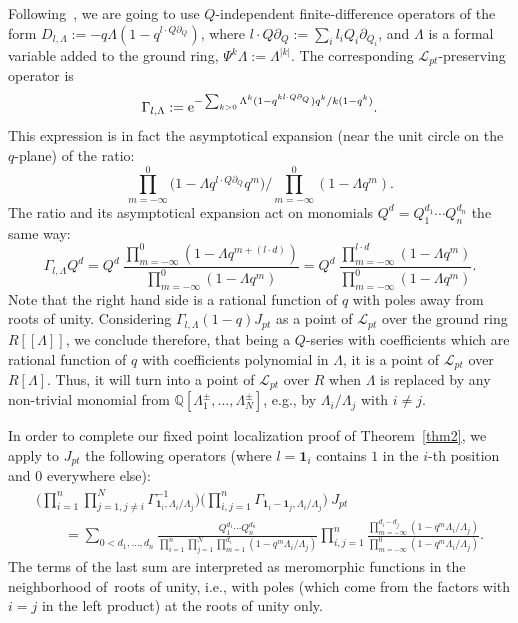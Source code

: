 \documentclass[pdftex]{sigma}
\numberwithin{equation}{section}
\def\L{\mathcal L}
\def\1{\mathbf 1}
\def\QQ{\mathbb Q}
\def\p{\partial}
\begin{document}
Following~\cite{Givental:perm4}, we are going to use $Q$-independent finite-difference operators of the form $D_{l,\Lambda}:=-q \Lambda (1-q^{l\cdot Q\p_Q})$, where $l\cdot Q\p_Q:=\sum_i l_iQ_i\p_{Q_i}$, and $\Lambda$ is a formal variable added to the ground ring, $\Psi^k\Lambda:=\Lambda^{|k|}$. The corresponding $\L_{pt}$-preserving operator is
\[
\Gamma_{l,\Lambda}:= {\rm e}^{ -\sum_{k>0}\Lambda^k
(1-q^{kl\cdot Q\p_Q})q^k/k(1-q^k)}.
\]
This expression is in fact the asymptotical expansion (near the unit circle on the $q$-plane) of the ratio:
\[
\prod_{m=-\infty}^0\big(1-\Lambda q^{l\cdot Q\p_Q}q^m\big)/ \prod_{m=-\infty}^0(1-\Lambda q^m).
\]
The ratio and its asymptotical expansion act on monomials $Q^d=Q_1^{d_1}\cdots Q_n^{d_n}$ the same way:
\[
\Gamma_{l,\Lambda}Q^d= Q^d\ \frac{\prod_{m=-\infty}^0(1-\Lambda q^{m+(l\cdot d)})}{\prod_{m=-\infty}^0(1-\Lambda q^m)} = Q^d\ \frac{\prod_{m=-\infty}^{l\cdot d}(1-\Lambda q^m)}{\prod_{m=-\infty}^0(1-\Lambda q^m)}.
\]
Note that the right hand side is a rational function of $q$ with poles away from roots of unity. Considering $\Gamma_{l,\Lambda}(1-q)J_{pt}$ as a point of $\L_{pt}$ over the ground ring $R[[\Lambda]]$, we conclude therefore, that being a $Q$-series with coefficients which are rational function of $q$ with coefficients polynomial in $\Lambda$, it is a point of $\L_{pt}$ over $R[\Lambda]$. Thus, it will turn into a point of $\L_{pt}$ over $R$ when $\Lambda$ is replaced by any non-trivial monomial from $\QQ[\Lambda_1^{\pm},\dots,\Lambda_N^{\pm}]$, e.g., by $\Lambda_i/\Lambda_j$ with $i\neq j$.

In order to complete our fixed point localization proof of Theorem~\ref{thm2}, we apply to $J_{pt}$ the following operators (where $l=\1_i$ contains $1$ in the $i$-th position and $0$ everywhere else):
\begin{gather*}
\bigg(\prod_{i=1}^n\prod_{j=1, j\neq i}^N \Gamma^{-1}_{\1_i,\Lambda_i/\Lambda_j}\bigg) \bigg(\prod_{i,j=1}^n\Gamma_{\1_i-\1_j,\Lambda_i/\Lambda_j}\bigg)\ J_{pt}
\\ \qquad
{}=\sum_{0<d_1,\dots,d_n}\frac{Q_1^{d_1}\cdots Q_n^{d_n}}{\prod_{i=1}^n\prod_{j=1}^N\prod_{m=1}^{d_i}(1-q^m\Lambda_i/\Lambda_j)} \prod_{i,j=1}^n\frac{\prod_{m=-\infty}^{d_i-d_j}(1-q^m\Lambda_i/\Lambda_j)}{\prod_{m=-\infty}^0(1-q^m\Lambda_i/\Lambda_j)}.
\end{gather*}
The terms of the last sum are interpreted as meromorphic functions in the neighborhood of~roots of unity, i.e., with poles (which come from the factors with $i=j$ in the left product) at the roots of unity only.
\end{document}
